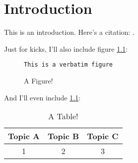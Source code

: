 \chapter{Introduction}\label{ch:intro}

This is an introduction. Here's a citation: \cite{wagner_mcnp:_1992}.

Just for kicks, I'll also include figure \ref{fig:fig}:

\begin{figure}[h!]
\begin{Verbatim}[frame=single]
This is a verbatim figure
\end{Verbatim}
\caption{A Figure!}
\label{fig:fig}
\end{figure}

And I'll even include \ref{tab:tab}:

\begin{table} [h]
\centering
\begin{tabular} {|c|c|c|} 
\hline
Topic A & Topic B & Topic C \\
\hline
1       & 2       & 3        \\
\hline
\end{tabular}
\caption{A Table!}
\label{tab:tab}
\end{table}